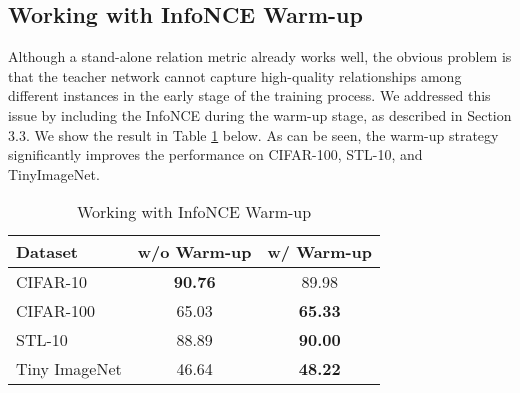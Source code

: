 \documentclass{article}
\newcommand{\<}{\left\langle}
\renewcommand{\>}{\right\rangle}
\begin{document}
\subsection{Working with InfoNCE Warm-up} 
Although a stand-alone relation metric already works well, the obvious problem is that the teacher network cannot capture high-quality relationships among different instances in the early stage of the training process. We addressed this issue by including the InfoNCE during the warm-up stage, as described in Section 3.3. We show the result in Table \ref{table:ablation_wamrup} below. As can be seen, the warm-up strategy significantly improves the performance on CIFAR-100, STL-10, and TinyImageNet.
\renewcommand\arraystretch{1.0}
\begin{table}[h]
 \centering
 \vspace{-5pt}
 \caption{Working with InfoNCE Warm-up}
 \vspace{-10pt}
 \label{table:ablation_wamrup}
\begin{tabular}{l c c } 
\toprule 
Dataset & w/o Warm-up & w/ Warm-up  \\ \hline
CIFAR-10 & \textbf{90.76} & 89.98   \\ \hline
CIFAR-100 & 65.03 & \textbf{65.33}   \\ \hline
STL-10 & 88.89 & \textbf{90.00}   \\ \hline
Tiny ImageNet & 46.64 & \textbf{48.22}   \\
\bottomrule 
\end{tabular}
\vspace{-10pt}
\end{table}
\end{document}
